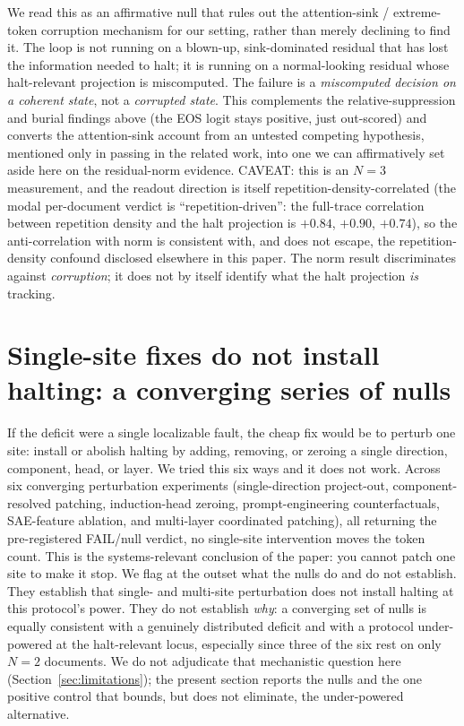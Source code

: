 \documentclass[11pt]{article}
\begin{document}
We read this as an affirmative null that rules out the attention-sink / extreme-token
corruption mechanism for our setting, rather than merely declining to find it. The loop
is not running on a blown-up, sink-dominated residual that has lost the information needed
to halt; it is running on a normal-looking residual whose halt-relevant projection is
miscomputed. The failure is a \emph{miscomputed decision on a coherent state}, not a
\emph{corrupted state}. This complements the relative-suppression and burial findings
above (the EOS logit stays positive, just out-scored) and converts the attention-sink
account from an untested competing hypothesis, mentioned only in passing in the related
work, into one we can affirmatively set aside here on the residual-norm evidence.
CAVEAT: this is an $N=3$ measurement, and the readout direction is itself
repetition-density-correlated (the modal per-document verdict is
``repetition-driven'': the full-trace correlation between repetition density and the
halt projection is $+0.84$, $+0.90$, $+0.74$), so the anti-correlation with norm is
consistent with, and does not escape, the repetition-density confound disclosed
elsewhere in this paper. The norm result discriminates against \emph{corruption}; it does
not by itself identify what the halt projection \emph{is} tracking.

\section{Single-site fixes do not install halting: a converging series of nulls}
\label{sec:causal}

If the deficit were a single localizable fault, the cheap fix would be to perturb one
site: install or abolish halting by adding, removing, or zeroing a single direction,
component, head, or layer. We tried this six ways and it does not work. Across six
converging perturbation experiments (single-direction project-out, component-resolved
patching, induction-head zeroing, prompt-engineering counterfactuals, SAE-feature
ablation, and multi-layer coordinated patching), all returning the pre-registered
FAIL/null verdict, no single-site intervention moves the token count. This is the
systems-relevant conclusion of the paper: you cannot patch one site to make it stop. We
flag at the outset what the nulls do and do not establish. They establish that single-
and multi-site perturbation does not install halting at this protocol's power. They do not
establish \emph{why}: a converging set of nulls is equally consistent with a genuinely
distributed deficit and with a protocol under-powered at the halt-relevant locus,
especially since three of the six rest on only $N=2$ documents. We do not adjudicate that
mechanistic question here (Section~\ref{sec:limitations}); the present section reports the
nulls and the one positive control that bounds, but does not eliminate, the under-powered
alternative.
\end{document}
